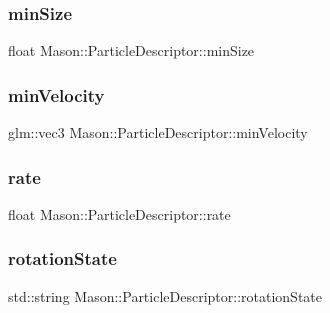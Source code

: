 \subsubsection{\texorpdfstring{min\+Size}{minSize}}
{\footnotesize\ttfamily float Mason\+::\+Particle\+Descriptor\+::min\+Size}

\hypertarget{class_mason_1_1_particle_descriptor_a6412dbc10bc67e2e8b21faef1c050a67}{}\label{class_mason_1_1_particle_descriptor_a6412dbc10bc67e2e8b21faef1c050a67} 
\subsubsection{\texorpdfstring{min\+Velocity}{minVelocity}}
{\footnotesize\ttfamily glm\+::vec3 Mason\+::\+Particle\+Descriptor\+::min\+Velocity}

\hypertarget{class_mason_1_1_particle_descriptor_a250f9c2c5b3fa119d0a38311e301fd2a}{}\label{class_mason_1_1_particle_descriptor_a250f9c2c5b3fa119d0a38311e301fd2a} 
\subsubsection{\texorpdfstring{rate}{rate}}
{\footnotesize\ttfamily float Mason\+::\+Particle\+Descriptor\+::rate}

\hypertarget{class_mason_1_1_particle_descriptor_ac192d2da527967c55804632bc6c0ca9e}{}\label{class_mason_1_1_particle_descriptor_ac192d2da527967c55804632bc6c0ca9e} 
\subsubsection{\texorpdfstring{rotation\+State}{rotationState}}
{\footnotesize\ttfamily std\+::string Mason\+::\+Particle\+Descriptor\+::rotation\+State}

\hypertarget{class_mason_1_1_particle_descriptor_a67edecae2a5df1c28ccc2f7cdb0a615f}{}\label{class_mason_1_1_particle_descriptor_a67edecae2a5df1c28ccc2f7cdb0a615f} 
